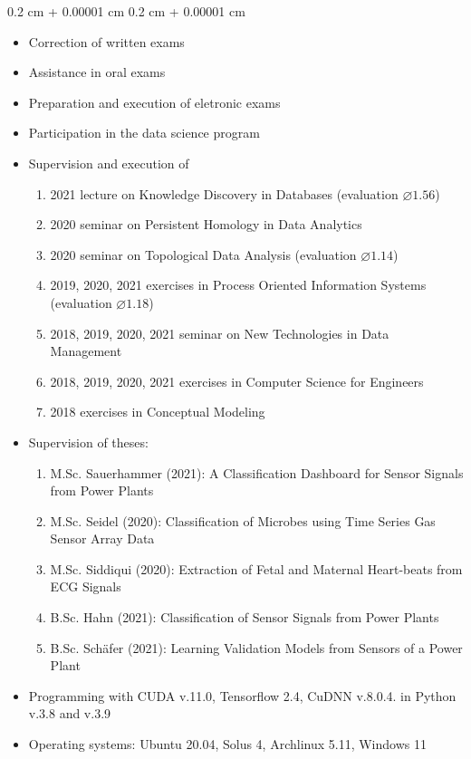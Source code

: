 \documentclass[10pt, letterpaper]{article}
\newenvironment{highlights}{
    \begin{itemize}[
        topsep=0.10 cm,
        parsep=0.10 cm,
        partopsep=0pt,
        itemsep=0pt,
        leftmargin=0.4 cm + 10pt
    ]
}{
    \end{itemize}
}
\newenvironment{onecolentry}{
    \begin{adjustwidth}{
        0.2 cm + 0.00001 cm
    }{
        0.2 cm + 0.00001 cm
    }
}{
    \end{adjustwidth}
}
\begin{document}
\begin{onecolentry}
\begin{highlights}
		\item Correction of written exams
        \item Assistance in oral exams
        \item Preparation and execution of eletronic exams
        \item Participation in the data science program
        \item Supervision and execution of
        \begin{enumerate}
            \item 2021 lecture on Knowledge Discovery in Databases (evaluation $\varnothing 1.56$)
            \item 2020 seminar on Persistent Homology in Data Analytics
            \item 2020 seminar on Topological Data Analysis (evaluation $\varnothing 1.14$)
            \item 2019, 2020, 2021 exercises in Process Oriented Information Systems (evaluation $\varnothing 1.18$)
            \item 2018, 2019, 2020, 2021 seminar on New Technologies in Data Management
            \item 2018, 2019, 2020, 2021 exercises in Computer Science for Engineers
            \item 2018 exercises in Conceptual Modeling
        \end{enumerate}
        \item Supervision of theses:
        \begin{enumerate}
            \item M.Sc. Sauerhammer (2021): A Classification Dashboard for Sensor Signals from Power Plants
            \item M.Sc. Seidel (2020): Classification of Microbes using Time Series Gas Sensor Array Data
            \item M.Sc. Siddiqui (2020): Extraction of Fetal and Maternal Heart-beats from ECG Signals
            \item B.Sc. Hahn (2021): Classification of Sensor Signals from Power Plants
            \item B.Sc. Schäfer (2021): Learning Validation Models from Sensors of a
Power Plant
        \end{enumerate}
        \item Programming with CUDA v.11.0, Tensorflow 2.4, CuDNN v.8.0.4. in Python v.3.8 and v.3.9
        \item Operating systems: Ubuntu 20.04, Solus 4, Archlinux 5.11, Windows 11
	\end{highlights}
\end{onecolentry}
\vspace{0.2 cm}
\end{document}
